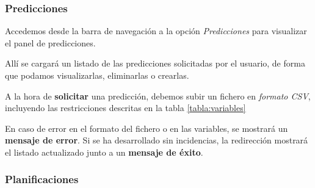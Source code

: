 \subsubsection{Predicciones}

Accedemos desde la barra de navegación a la opción \textit{Predicciones} para visualizar el panel de predicciones.

Allí se cargará un listado de las predicciones solicitadas por el usuario, de forma que podamos visualizarlas, eliminarlas o crearlas.


A la hora de \textbf{solicitar} una predicción, debemos subir un fichero en \textit{formato CSV}, incluyendo las restricciones descritas en la tabla \ref{tabla:variables}


En caso de error en el formato del fichero o en las variables, se mostrará un \textbf{mensaje de error}. Si se ha desarrollado sin incidencias, la redirección mostrará el listado actualizado junto a un \textbf{mensaje de éxito}.



\subsubsection{Planificaciones}



